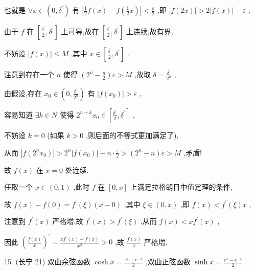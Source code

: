 \documentclass[10pt]{article}
\begin{document}
也就是 \(\forall x \in  \left( {0,{\delta }^{\prime }}\right)\) 有 \(\left| {\frac{1}{2}f\left( x\right)  - f\left( {\frac{1}{2}x}\right) }\right|  < \frac{\varepsilon }{2}\) ,即 \(\left| {f\left( {2x}\right) }\right|  > 2\left| {f\left( x\right) }\right|  - \varepsilon\) ,

由于 \(f\) 在 \(\left\lbrack  {\frac{{\delta }^{\prime }}{2},{\delta }^{\prime }}\right\rbrack\) 上可导,故在 \(\left\lbrack  {\frac{{\delta }^{\prime }}{2},{\delta }^{\prime }}\right\rbrack\) 上连续,故有界,

不妨设 \(\left| {f\left( x\right) }\right|  \leq  M\) ,其中 \(x \in  \left\lbrack  {\frac{{\delta }^{\prime }}{2},{\delta }^{\prime }}\right\rbrack\) .

注意到存在一个 \(n\) 使得 \(\left( {{2}^{n} - \frac{n}{2}}\right) \varepsilon  > M\) ,故取 \(\delta  = \frac{{\delta }^{\prime }}{{2}^{n}}\) ,

由假设,存在 \({x}_{0} \in  \left( {0,\frac{{\delta }^{\prime }}{{2}^{n}}}\right)\) 有 \(\left| {f\left( {x}_{0}\right) }\right|  > \varepsilon\) ,

容易知道 \(\exists k \in  N\) 使得 \({2}^{n + k}{x}_{0} \in  \left\lbrack  {\frac{{\delta }^{\prime }}{2},{\delta }^{\prime }}\right\rbrack\) ,

不妨设 \(k = 0\) (如果 \(k > 0\) ,则后面的不等式更加满足了),

从而 \(\left| {f\left( {{2}^{n}{x}_{0}}\right) }\right|  > {2}^{n}\left| {f\left( {x}_{0}\right) }\right|  - n \cdot  \frac{\varepsilon }{2} > \left( {{2}^{n} - n}\right) \varepsilon  > M\) ,矛盾!

故 \(f\left( x\right)\) 在 \(x = 0\) 处连续.

任取一个 \(x \in  \left( {0,1}\right)\) ,此时 \(f\) 在 \(\left\lbrack  {0,x}\right\rbrack\) 上满足拉格朗日中值定理的条件,

故 \(f\left( x\right)  - f\left( 0\right)  = {f}^{\prime }\left( \xi \right) \left( {x - 0}\right)\) ,其中 \(\xi  \in  \left( {0,x}\right)\) ,即 \(f\left( x\right)  < {f}^{\prime }\left( \xi \right) x\) ,

注意到 \({f}^{\prime }\left( x\right)\) 严格增,故 \({f}^{\prime }\left( x\right)  > {f}^{\prime }\left( \xi \right)\) ,从而 \(f\left( x\right)  < x{f}^{\prime }\left( x\right)\) ,

因此 \({\left( \frac{f\left( x\right) }{x}\right) }^{\prime } = \frac{x{f}^{\prime }\left( x\right)  - f\left( x\right) }{{x}^{2}} > 0\) ,故 \(\frac{f\left( x\right) }{x}\) 严格增.

15. (长宁 21) 双曲余弦函数 \(\cosh x = \frac{{e}^{x} + {e}^{-x}}{2}\) ,双曲正弦函数 \(\sinh x = \frac{{e}^{x} - {e}^{-x}}{2}\) .
\end{document}
